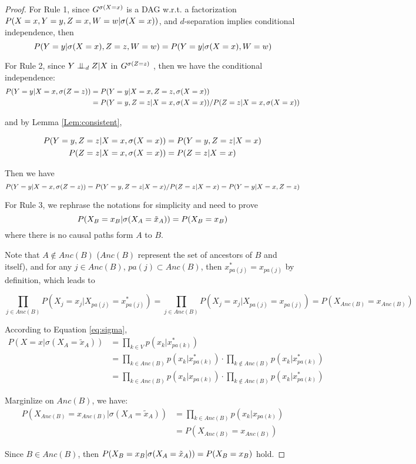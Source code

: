 \begin{proof}
	For Rule 1,  since $G^{\mathrm{\sigma}(X=x)}$ is a DAG w.r.t. a factorization $P(X=x, Y=y, Z=x, W=w|\mathrm{\sigma}(X=x))$, and $d$-separation implies conditional independence, then
	$$
	P(Y=y|\mathrm{\sigma}(X=x), Z=z, W=w) = P(Y=y|\mathrm{\sigma}(X=x), W=w)
	$$
	
	For Rule 2, since $Y\perp\mkern-9.5mu\perp_d Z|X$ in $G^{\mathrm{\sigma}(Z=z)}$ , then we have the conditional independence:
	\begin{align*}
		P(Y=y|X=x, \mathrm{\sigma}(Z=z)) &= P(Y=y|X=x, Z=z, \mathrm{\sigma}(X=x)) \\
		&= P(Y=y, Z=z|X=x, \mathrm{\sigma}(X=x)) / P(Z=z|X=x, \mathrm{\sigma}(X=x))
	\end{align*}

	and by Lemma \ref{Lem:consistent}, 
	
	\begin{align*}
		P(Y=y, Z=z|X=x, \mathrm{\sigma}(X=x)) &= P(Y=y, Z=z|X=x) 	\\
		P(Z=z|X=x, \mathrm{\sigma}(X=x))  &= P(Z=z|X=x)
	\end{align*}
		
	Then we have 
	$$
	P(Y=y|X=x, \mathrm{\sigma}(Z=z))  = P(Y=y, Z=z|X=x) /  P(Z=z|X=x)  = P(Y=y|X=x, Z=z)
	$$
	
	For Rule 3, we rephrase the notations for simplicity and need to prove
	$$
	P(X_B=x_B|\mathrm{\sigma}(X_A=\tilde{x}_A)) = P(X_B=x_B)
	$$
	where there is no causal paths form $A$ to $B$.
	
	Note that $A \notin Anc(B)$ ($Anc(B)$ represent the set of ancestors of $B$ and itself), and for any $j \in Anc(B)$, $pa(j) \subset Anc(B)$, then 
	$x^*_{pa(j)} = x_{pa(j)}$ by definition, which leads to  
	
	$$
	\prod_{j \in Anc(B)}P(X_j=x_j|X_{pa(j)} = x^*_{pa(j)}) = \prod_{j \in Anc(B)}P(X_j=x_j|X_{pa(j)} = x_{pa(j)})  = P(X_{Anc(B)} = x_{Anc(B)}) 
	$$ 

	 According to Equation \ref{eq:sigma}, 
	 \begin{align*}
	 	P(X=x| \sigma(X_A =\tilde{x}_A)) &= \prod_{k \in V} p(x_k|x_{pa(k)}^*) \\
	 	&= \prod_{k \in Anc(B)} p(x_k|x_{pa(k)}^*) \cdot  \prod_{k \notin Anc(B)} p(x_k|x_{pa(k)}^*) \\
	 	&= \prod_{k \in Anc(B)} p(x_k|x_{pa(k)}) \cdot  \prod_{k \notin Anc(B)} p(x_k|x_{pa(k)}^*)
	  \end{align*}
	  
	 Marginlize on $Anc(B)$, we have:
	\begin{align*}
		P(X_{Anc(B)} = x_{Anc(B)}| \sigma(X_A =\tilde{x}_A)) &= \prod_{k \in Anc(B)} p(x_k|x_{pa(k)}) \\
		&= P(X_{Anc(B)} = x_{Anc(B)})
	\end{align*}	  
	 
	 Since $B \in Anc(B)$, then $P(X_B=x_B|\mathrm{\sigma}(X_A=\tilde{x}_A)) = P(X_B=x_B)$ hold.
	  
	
\end{proof}

